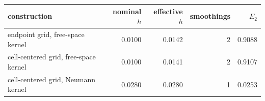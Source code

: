 \begin{tabular}{lrrrr}
\toprule
construction & nominal $h$ & effective $h$ & smoothings & $E_2$ \\
\midrule
endpoint grid, free-space kernel & 0.0100 & 0.0142 & 2 & 0.9088 \\
cell-centered grid, free-space kernel & 0.0100 & 0.0141 & 2 & 0.9107 \\
cell-centered grid, Neumann kernel & 0.0280 & 0.0280 & 1 & 0.0253 \\
\bottomrule
\end{tabular}
